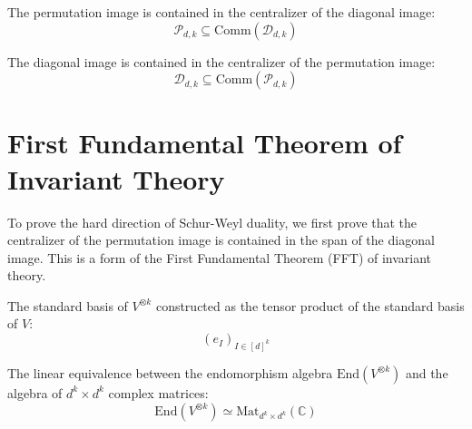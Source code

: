 \begin{theorem}\label{thm:permImage_subset_centralizer_diagImage}
  \leanok
  The permutation image is contained in the centralizer of the diagonal image:
  \begin{equation}
    \mathcal{P}_{d,k} \subseteq \text{Comm}(\mathcal{D}_{d,k})
  \end{equation}
\end{theorem}

\begin{theorem}\label{thm:diagImage_subset_centralizer_permImage}
  \leanok
  The diagonal image is contained in the centralizer of the permutation image:
  \begin{equation}
    \mathcal{D}_{d,k} \subseteq \text{Comm}(\mathcal{P}_{d,k})
  \end{equation}
\end{theorem}


\section{First Fundamental Theorem of Invariant Theory}

To prove the hard direction of Schur-Weyl duality, we first prove that the centralizer of the permutation image is contained in the span of the diagonal image. This is a form of the First Fundamental Theorem (FFT) of invariant theory.

\begin{definition}\label{def:tensorBasis'}
  \leanok
  The standard basis of $V^{\otimes k}$ constructed as the tensor product of the standard basis of $V$:
  \begin{equation}
    (e_I)_{I \in [d]^k}
  \end{equation}
\end{definition}

\begin{definition}\label{def:toEndMatrix'}
  \leanok
  The linear equivalence between the endomorphism algebra $\text{End}(V^{\otimes k})$ and the algebra of $d^k \times d^k$ complex matrices:
  \begin{equation}
    \text{End}(V^{\otimes k}) \simeq \text{Mat}_{d^k \times d^k}(\mathbb{C})
  \end{equation}
\end{definition}

